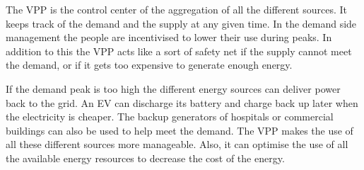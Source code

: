 The VPP is the control center of the aggregation of all the different sources. It keeps track of the demand and the supply at any given time. In the demand side management the people are incentivised to lower their use during peaks. In addition to this the VPP acts like a sort of safety net if the supply cannot meet the demand, or if it gets too expensive to generate enough energy. \cite{vpprealenergy}

If the demand peak is too high the different energy sources can deliver power back to the grid. An EV can discharge its battery and charge back up later when the electricity is cheaper. The backup generators of hospitals or commercial buildings can also be used to help meet the demand. The VPP makes the use of all these different sources more manageable. Also, it can optimise the use of all the available energy resources to decrease the cost of the energy.\cite{microgridsmarketenv}